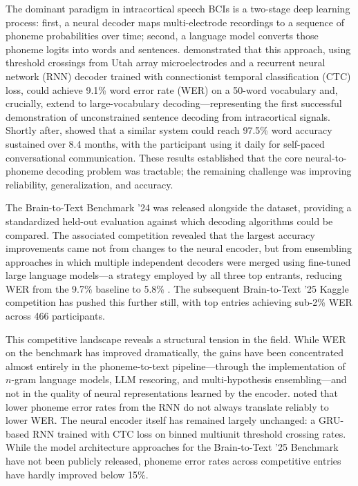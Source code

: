 \documentclass{article}
\begin{document}
The dominant paradigm in intracortical speech BCIs is a two-stage deep learning process:
first, a neural decoder maps multi-electrode recordings to a sequence of phoneme probabilities
over time; second, a language model converts those phoneme logits into words and sentences.
\citet{willett2023high} demonstrated that this approach, using threshold crossings from Utah
array microelectrodes and a recurrent neural network (RNN) decoder trained with connectionist
temporal classification (CTC) loss, could achieve 9.1\% word error rate (WER) on a 50-word
vocabulary and, crucially, extend to large-vocabulary decoding---representing the first
successful demonstration of unconstrained sentence decoding from intracortical signals.
Shortly after, \citet{card2024accurate} showed that a similar system could reach 97.5\% word
accuracy sustained over 8.4 months, with the participant using it daily for self-paced
conversational communication. These results established that the core neural-to-phoneme
decoding problem was tractable; the remaining challenge was improving reliability,
generalization, and accuracy.

The Brain-to-Text Benchmark '24 was released alongside the \citet{willett2023high} dataset,
providing a standardized held-out evaluation against which decoding algorithms could be
compared. The associated competition revealed that the largest accuracy improvements came
not from changes to the neural encoder, but from ensembling approaches in which multiple
independent decoders were merged using fine-tuned large language models---a strategy
employed by all three top entrants, reducing WER from the 9.7\% baseline to 5.8\%
\citep{willett2024lessons}. The subsequent Brain-to-Text '25 Kaggle competition has pushed
this further still, with top entries achieving sub-2\% WER across 466 participants.

This competitive landscape reveals a structural tension in the field. While WER on the
benchmark has improved dramatically, the gains have been concentrated almost entirely in
the phoneme-to-text pipeline---through the implementation of $n$-gram language models,
LLM rescoring, and multi-hypothesis ensembling---and not in the quality of neural
representations learned by the encoder. \citet{willett2024lessons} noted that lower phoneme
error rates from the RNN do not always translate reliably to lower WER. The neural encoder
itself has remained largely unchanged: a GRU-based RNN trained with CTC loss on binned
multiunit threshold crossing rates. While the model architecture approaches for the
Brain-to-Text '25 Benchmark have not been publicly released, phoneme error rates across
competitive entries have hardly improved below 15\%.
\end{document}
